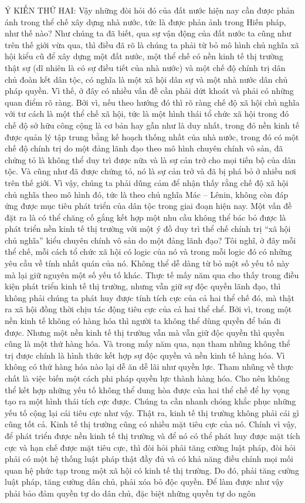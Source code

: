 Ý KIẾN THỨ HAI: Vậy những đòi hỏi đó của đất nước hiện nay cần được phản ánh trong thể chế xây dựng nhà nước, tức là được phản ảnh trong Hiến pháp, như thế nào? Như chúng ta đã biết, qua sự vận động của đất nước ta cũng như trên thế giới vừa qua, thì điều đã rõ là chúng ta phải từ bỏ mô hình chủ nghĩa xã hội kiểu cũ để xây dựng một đất nước, một thể chế có nền kinh tế thị trường thật sự (dĩ nhiên là có sự điều tiết của nhà nước) và một chế độ chính trị dân chủ đoàn kết dân tộc, có nghĩa là một xã hội dân sự và một nhà nước dân chủ pháp quyền. Vì thế, ở đây có nhiều vấn đề cần phải dứt khoát và phải có những quan điểm rõ ràng. Bởi vì, nếu theo hướng đó thì rõ ràng chế độ xã hội chủ nghĩa với tư cách là một thể chế xã hội, tức là một hình thái tổ chức xã hội trong đó chế độ sở hữu công cộng là cơ bản hay gần như là duy nhất, trong đó nền kinh tế được quản lý tập trung bằng kế hoạch thống nhất của nhà nước, trong đó có một chế độ chính trị do một đảng lãnh đạo theo mô hình chuyên chính vô sản, đã chứng tỏ là không thể duy trì được nữa và là sự cản trở cho mọi tiến bộ của dân tộc. Và cũng như đã được chứng tỏ, nó là sự cản trở và đã bị phá bỏ ở nhiều nơi trên thế giới. Vì vậy, chúng ta phải dũng cảm để nhận thấy rằng chế độ xã hội chủ nghĩa theo mô hình đó, tức là theo chủ nghĩa Mác – Lênin, không còn đáp ứng được mục tiêu phát triển của dân tộc trong giai đoạn hiện nay. Một vấn đề đặt ra là có thể chăng cố gắng kết hợp một nhu cầu không thể bác bỏ được là phát triển nền kinh tế thị trường với một ý đồ duy trì thể chế chính trị “xã hội chủ nghĩa” kiểu chuyên chính vô sản do một đảng lãnh đạo? Tôi nghĩ, ở đây mỗi thể chế, mỗi cách tổ chức xã hội có logic của nó và trong mỗi logic đó có những yêu cầu về tính nhất quán của nó. Không thể dễ dàng từ bỏ một số yếu tố này mà lại giữ nguyên một số yếu tố khác. Thực tế mấy năm qua cho thấy trong điều kiện phát triển kinh tế thị trường, nhưng vẫn giữ sự độc quyền lãnh đạo, thì không phải chúng ta phát huy được tính tích cực của cả hai thể chế đó, mà thật ra xã hội đồng thời chịu tác động tiêu cực của cả hai thể chể. Bởi vì, trong một nền kinh tế không có hàng hóa thì người ta không thể dùng quyền để bán đi được. Nhưng một nền kinh tế thị trường vẫn mà vẫn giữ độc quyền thì quyền cũng là một thứ hàng hóa. Và trong mấy năm qua, nạn tham nhũng không thể trị được chính là hình thức kết hợp sự độc quyền và nền kinh tế hàng hóa. Vì không có thứ hàng hóa nào lại dễ ăn dễ lãi như quyền lực. Tham nhũng về thực chất là việc biến một cách phi pháp quyền lực thành hàng hóa. Cho nên không thể kết hợp những yếu tố không thể dung hòa được của hai thể chế để hy vọng tạo ra một hình thái tích cực được. Chúng ta cần nhanh chóng khắc phục những yếu tố cộng lại cái tiêu cực như vậy. Thật ra, kinh tế thị trường không phải cái gì cũng tốt cả. Kinh tế thị trường cũng có nhiều mặt tiêu cực của nó. Chính vì vậy, để phát triển được nền kinh tế thị trường và để nó có thể phát huy được mặt tích cực và hạn chế được mặt tiêu cực, thì đòi hỏi phải tăng cường luật pháp, đòi hỏi phải có một hệ thống luật pháp thật đầy đủ và có khả năng điều chỉnh mọi mối quan hệ phức tạp trong một xã hội có kinh tế thị trường. Do đó, phải tăng cường luật pháp, tăng cường dân chủ, phải xóa bỏ độc quyền. Để làm được như vậy phải bảo đảm quyền tự do dân chủ, đặc biệt những quyền tự do ngôn 